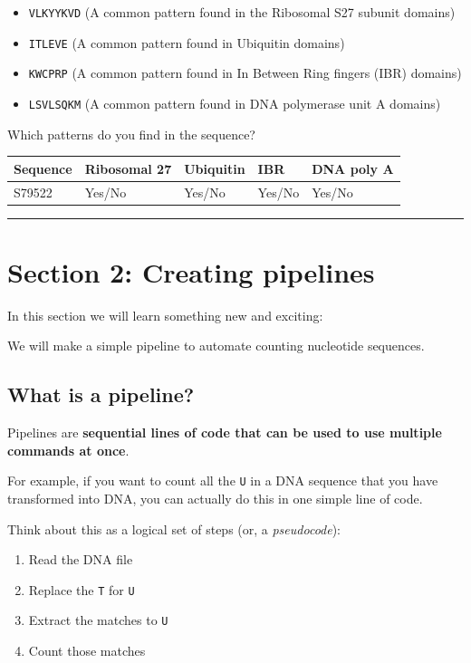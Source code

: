 \documentclass[
]{book}
\providecommand{\tightlist}{%
  \setlength{\itemsep}{0pt}\setlength{\parskip}{0pt}}
\begin{document}
\begin{itemize}
\tightlist
\item
  \texttt{VLKYYKVD} (A common pattern found in the Ribosomal S27 subunit domains)
\item
  \texttt{ITLEVE} (A common pattern found in Ubiquitin domains)
\item
  \texttt{KWCPRP} (A common pattern found in In Between Ring fingers (IBR) domains)
\item
  \texttt{LSVLSQKM} (A common pattern found in DNA polymerase unit A domains)
\end{itemize}

Which patterns do you find in the sequence?

\begin{longtable}[]{@{}lllll@{}}
\toprule()
Sequence & Ribosomal 27 & Ubiquitin & IBR & DNA poly A \\
\midrule()
\endhead
S79522 & Yes/No & Yes/No & Yes/No & Yes/No \\
\bottomrule()
\end{longtable}

\begin{center}\rule{0.5\linewidth}{0.5pt}\end{center}

\hypertarget{section-2-creating-pipelines}{%
\section{Section 2: Creating pipelines}\label{section-2-creating-pipelines}}

In this section we will learn something new and exciting:

We will make a simple pipeline to automate counting nucleotide sequences.

\hypertarget{what-is-a-pipeline}{%
\subsection{What is a pipeline?}\label{what-is-a-pipeline}}

Pipelines are \textbf{sequential lines of code that can be used to use multiple commands at once}.

For example, if you want to count all the \texttt{U} in a DNA sequence that you have transformed into DNA, you can actually do this in one simple line of code.

Think about this as a logical set of steps (or, a \emph{pseudocode}):

\begin{enumerate}
\def\labelenumi{\arabic{enumi}.}
\tightlist
\item
  Read the DNA file
\item
  Replace the \texttt{T} for \texttt{U}
\item
  Extract the matches to \texttt{U}
\item
  Count those matches
\end{enumerate}
\end{document}
